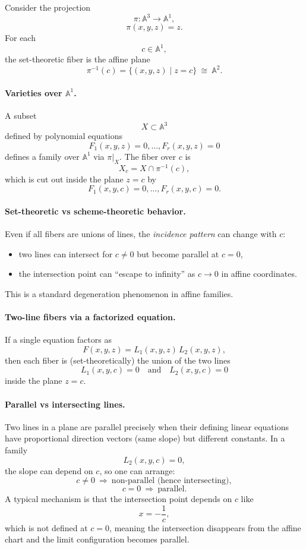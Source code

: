 \documentclass[12pt,a4paper]{article}
\theoremstyle{plain}
\theoremstyle{definition}      %
\begin{document}
Consider the projection
\[
\pi:\mathbb{A}^3 \longrightarrow \mathbb{A}^1,
\]
\[
\pi(x,y,z)=z.
\]
For each
\[
c\in \mathbb{A}^1,
\]
the set-theoretic fiber is the affine plane
\[
\pi^{-1}(c)=\{(x,y,z)\mid z=c\}
\ \cong\
\mathbb{A}^2.
\]

\paragraph{Varieties over $\mathbb{A}^1$.}
A subset
\[
X\subset \mathbb{A}^3
\]
defined by polynomial equations
\[
F_1(x,y,z)=0,\dots,F_r(x,y,z)=0
\]
defines a family over $\mathbb{A}^1$ via $\pi|_X$.
The fiber over $c$ is
\[
X_c
=
X\cap \pi^{-1}(c),
\]
which is cut out inside the plane $z=c$ by
\[
F_1(x,y,c)=0,\dots,F_r(x,y,c)=0.
\]

\paragraph{Set-theoretic vs scheme-theoretic behavior.}
Even if all fibers are unions of lines, the \emph{incidence pattern} can change with $c$:
\begin{itemize}
	\item two lines can intersect for $c\neq 0$ but become parallel at $c=0$,
	\item the intersection point can “escape to infinity” as $c\to 0$ in affine coordinates.
\end{itemize}
This is a standard degeneration phenomenon in affine families.

\paragraph{Two-line fibers via a factorized equation.}
If a single equation factors as
\[
F(x,y,z)=L_1(x,y,z)\,L_2(x,y,z),
\]
then each fiber is (set-theoretically) the union of the two lines
\[
L_1(x,y,c)=0
\quad\text{and}\quad
L_2(x,y,c)=0
\]
inside the plane $z=c$.

\paragraph{Parallel vs intersecting lines.}
Two lines in a plane are parallel precisely when their defining linear equations have proportional direction vectors (same slope) but different constants.
In a family
\[
L_2(x,y,c)=0,
\]
the slope can depend on $c$, so one can arrange:
\[
c\neq 0
\ \Rightarrow\
\text{non-parallel (hence intersecting)},
\]
\[
c=0
\ \Rightarrow\
\text{parallel}.
\]
A typical mechanism is that the intersection point depends on $c$ like
\[
x=-\frac{1}{c},
\]
which is not defined at $c=0$, meaning the intersection disappears from the affine chart and the limit configuration becomes parallel.
\end{document}
